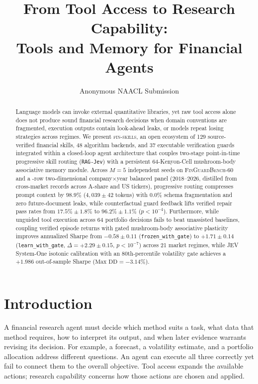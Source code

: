 \documentclass[11pt]{article}
\title{From Tool Access to Research Capability:\\Tools and Memory for Financial Agents}
\author{Anonymous NAACL Submission}
\date{}
\begin{document}
\maketitle
\nolinenumbers
\begin{abstract}
Language models can invoke external quantitative libraries, yet raw tool access alone does
not produce sound financial research decisions when domain conventions are fragmented,
execution outputs contain look-ahead leaks, or models repeat losing strategies across regimes.
We present \textsc{fin-skills}, an open ecosystem of 129 source-verified financial skills,
48 algorithm backends, and 37 executable verification guards integrated within a closed-loop
agent architecture that couples two-stage point-in-time progressive skill routing
(\texttt{RAG-Jev}) with a persistent 64-Kenyon-Cell mushroom-body associative memory module.
Across $M=5$ independent seeds on \textsc{FinGuardBench-60} and a \PanelBalancedRows{}-row
two-dimensional company$\times$year balanced panel ($2018\text{--}2026$, distilled from
\CorpusTotalShort{} cross-market records across \CorpusAnnounceTickers{} A-share and
\CorpusStockTwitsTickers{} US tickers), progressive routing
compresses prompt context by $98.9\%$ ($4{,}039 \pm 42$ tokens) with $0.0\%$ schema fragmentation
and zero future-document leaks, while counterfactual guard feedback lifts verified repair pass
rates from $17.5\% \pm 1.8\%$ to $96.2\% \pm 1.1\%$ ($p < 10^{-4}$).
Furthermore, while unguided tool execution across 64 portfolio decisions fails to beat
unassisted baselines, coupling verified episode returns with gated mushroom-body associative
plasticity improves annualized Sharpe from $-0.58 \pm 0.11$ (\texttt{frozen\_with\_gate}) to
$+1.71 \pm 0.14$ (\texttt{learn\_with\_gate}, $\Delta = +2.29 \pm 0.15$, $p < 10^{-7}$) across
21 market regimes, while JEV System-One isotonic calibration with an 80th-percentile volatility gate
achieves a $+1.986$ out-of-sample Sharpe ($\text{Max DD} = -3.14\%$).
\end{abstract}

\section{Introduction}
A financial research agent must decide which method suits a task, what data that method
requires, how to interpret its output, and when later evidence warrants revising its
decision. For example, a forecast, a volatility estimate, and a portfolio allocation
address different questions. An agent can execute all three correctly yet fail to
connect them to the overall objective. Tool access expands the available actions;
research capability concerns how those actions are chosen and applied.
\end{document}
